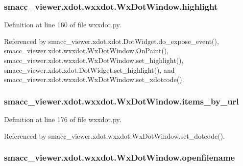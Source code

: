 \subsubsection[{\texorpdfstring{highlight}{highlight}}]{\setlength{\rightskip}{0pt plus 5cm}smacc\+\_\+viewer.\+xdot.\+wxxdot.\+Wx\+Dot\+Window.\+highlight}\hypertarget{classsmacc__viewer_1_1xdot_1_1wxxdot_1_1WxDotWindow_a15b4cfa87927f33d0f0cb3287a23ae7d}{}\label{classsmacc__viewer_1_1xdot_1_1wxxdot_1_1WxDotWindow_a15b4cfa87927f33d0f0cb3287a23ae7d}


Definition at line 160 of file wxxdot.\+py.



Referenced by smacc\+\_\+viewer.\+xdot.\+xdot.\+Dot\+Widget.\+do\+\_\+expose\+\_\+event(), smacc\+\_\+viewer.\+xdot.\+wxxdot.\+Wx\+Dot\+Window.\+On\+Paint(), smacc\+\_\+viewer.\+xdot.\+wxxdot.\+Wx\+Dot\+Window.\+set\+\_\+highlight(), smacc\+\_\+viewer.\+xdot.\+xdot.\+Dot\+Widget.\+set\+\_\+highlight(), and smacc\+\_\+viewer.\+xdot.\+wxxdot.\+Wx\+Dot\+Window.\+set\+\_\+xdotcode().

\subsubsection[{\texorpdfstring{items\+\_\+by\+\_\+url}{items_by_url}}]{\setlength{\rightskip}{0pt plus 5cm}smacc\+\_\+viewer.\+xdot.\+wxxdot.\+Wx\+Dot\+Window.\+items\+\_\+by\+\_\+url}\hypertarget{classsmacc__viewer_1_1xdot_1_1wxxdot_1_1WxDotWindow_a6583a761581fbcff431a9781d6cb6194}{}\label{classsmacc__viewer_1_1xdot_1_1wxxdot_1_1WxDotWindow_a6583a761581fbcff431a9781d6cb6194}


Definition at line 176 of file wxxdot.\+py.



Referenced by smacc\+\_\+viewer.\+xdot.\+wxxdot.\+Wx\+Dot\+Window.\+set\+\_\+dotcode().

\subsubsection[{\texorpdfstring{openfilename}{openfilename}}]{\setlength{\rightskip}{0pt plus 5cm}smacc\+\_\+viewer.\+xdot.\+wxxdot.\+Wx\+Dot\+Window.\+openfilename}\hypertarget{classsmacc__viewer_1_1xdot_1_1wxxdot_1_1WxDotWindow_a5ad7e5589b8697223cd75fb03e4c0d93}{}\label{classsmacc__viewer_1_1xdot_1_1wxxdot_1_1WxDotWindow_a5ad7e5589b8697223cd75fb03e4c0d93}


